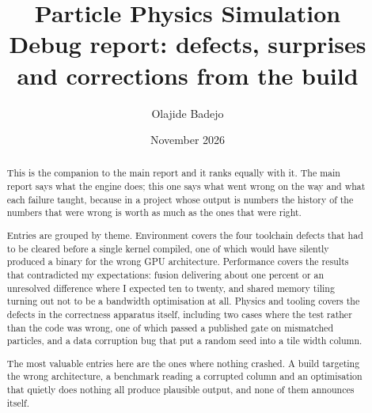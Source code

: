 \documentclass[11pt,a4paper]{report}
\title{\textbf{Particle Physics Simulation}\\[0.4em]
       \large Debug report: defects, surprises and corrections from the build}
\author{Olajide Badejo}
\date{November 2026}
\begin{document}
\maketitle

\begin{abstract}
\noindent
This is the companion to the main report and it ranks equally with it. The main
report says what the engine does; this one says what went wrong on the way and
what each failure taught, because in a project whose output is numbers the
history of the numbers that were wrong is worth as much as the ones that were
right.

Entries are grouped by theme. Environment covers the four toolchain defects
that had to be cleared before a single kernel compiled, one of which would have
silently produced a binary for the wrong GPU architecture. Performance covers
the results that contradicted my expectations: fusion delivering about one percent or an
unresolved difference where I expected ten to twenty, and shared memory tiling turning out
not to be a bandwidth optimisation at all. Physics
and tooling covers the defects in the correctness apparatus itself, including
two cases where the test rather than the code was wrong, one of which passed a published
gate on mismatched particles, and a data corruption bug that put a random seed into a tile width column.

The most valuable entries here are the ones where nothing crashed. A build
targeting the wrong architecture, a benchmark reading a corrupted column and an
optimisation that quietly does nothing all produce plausible output, and none
of them announces itself.
\end{abstract}

\tableofcontents





\end{document}
